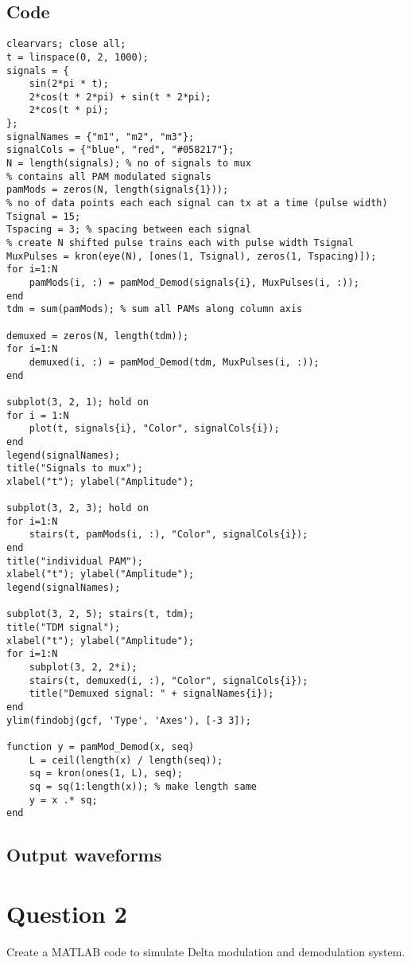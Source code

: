 \documentclass[12pt,a4paper]{report}
\begin{document}
 \subsection*{Code}
\begin{verbatim}
clearvars; close all;
t = linspace(0, 2, 1000);
signals = {
    sin(2*pi * t);
    2*cos(t * 2*pi) + sin(t * 2*pi);
    2*cos(t * pi);
};
signalNames = {"m1", "m2", "m3"};
signalCols = {"blue", "red", "#058217"};
N = length(signals); % no of signals to mux
% contains all PAM modulated signals
pamMods = zeros(N, length(signals{1}));
% no of data points each each signal can tx at a time (pulse width)
Tsignal = 15;
Tspacing = 3; % spacing between each signal
% create N shifted pulse trains each with pulse width Tsignal
MuxPulses = kron(eye(N), [ones(1, Tsignal), zeros(1, Tspacing)]);
for i=1:N
    pamMods(i, :) = pamMod_Demod(signals{i}, MuxPulses(i, :));
end
tdm = sum(pamMods); % sum all PAMs along column axis

demuxed = zeros(N, length(tdm));
for i=1:N
    demuxed(i, :) = pamMod_Demod(tdm, MuxPulses(i, :));
end

subplot(3, 2, 1); hold on
for i = 1:N
    plot(t, signals{i}, "Color", signalCols{i});
end
legend(signalNames);
title("Signals to mux");
xlabel("t"); ylabel("Amplitude");

subplot(3, 2, 3); hold on
for i=1:N
    stairs(t, pamMods(i, :), "Color", signalCols{i});
end
title("individual PAM");
xlabel("t"); ylabel("Amplitude");
legend(signalNames);

subplot(3, 2, 5); stairs(t, tdm);
title("TDM signal");
xlabel("t"); ylabel("Amplitude");
for i=1:N
    subplot(3, 2, 2*i);
    stairs(t, demuxed(i, :), "Color", signalCols{i});
    title("Demuxed signal: " + signalNames{i});
end
ylim(findobj(gcf, 'Type', 'Axes'), [-3 3]);

function y = pamMod_Demod(x, seq)
    L = ceil(length(x) / length(seq));
    sq = kron(ones(1, L), seq);
    sq = sq(1:length(x)); % make length same
    y = x .* sq;
end
\end{verbatim}

\subsection*{Output waveforms}
\begin{figure*}[!h]
    
\end{figure*}

\section*{Question 2}
Create a MATLAB code to simulate Delta modulation and demodulation system.
\end{document}
